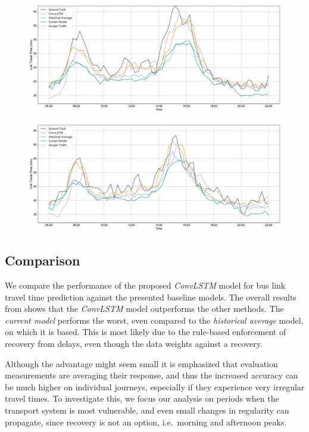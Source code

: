 \documentclass[preprint,11pt,5p,twocolumn]{elsarticle}
\begin{document}
\begin{figure}
  \centering
  \includegraphics[width=\textwidth]{plots/comparison_day.pdf}
  \caption{}
  \label{fig:comparison_day}
\end{figure}
\begin{figure}
  \centering
  \includegraphics[width=\textwidth]{plots/comparison_day_2.pdf}
  \caption{}
  \label{fig:comparison_day_2}
\end{figure}


\subsection{Comparison}
We compare the performance of the proposed \emph{ConvLSTM} model for bus link travel time prediction against the presented baseline models. The overall results from  shows that the \emph{ConvLSTM} model outperforms the other methods. The \emph{current model} performs the worst, even compared to the \emph{historical average} model, on which it is based. This is most likely due to the rule-based enforcement of recovery from delays, even though the data weights against a recovery.

Although the advantage might seem small it is emphasized that evaluation measurements are averaging their response, and thus the increased accuracy can be much higher on individual journeys, especially if they experience very irregular travel times. To investigate this, we focus our analysis on periods when the transport system is most vulnerable, and even small changes in regularity can propagate, since recovery is not an option, i.e.\ morning and afternoon peaks.
\end{document}
